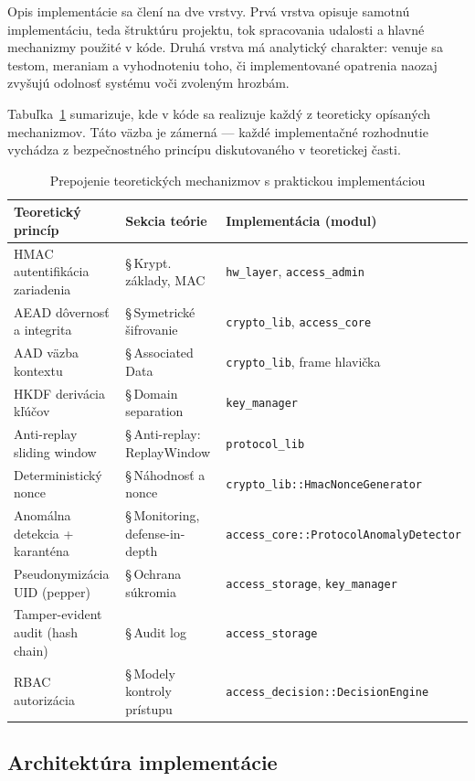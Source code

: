 \documentclass[journal,a4paper,onecolumn]{IEEEtran}
\begin{document}
Opis implementácie sa člení na dve vrstvy. Prvá vrstva opisuje samotnú implementáciu, teda štruktúru projektu, tok spracovania udalosti a hlavné mechanizmy použité v kóde. Druhá vrstva má analytický charakter: venuje sa testom, meraniam a vyhodnoteniu toho, či implementované opatrenia naozaj zvyšujú odolnosť systému voči zvoleným hrozbám.

Tabuľka~\ref{tab:theory-practice} sumarizuje, kde v kóde sa realizuje každý z teoreticky opísaných mechanizmov. Táto väzba je zámerná --- každé implementačné rozhodnutie vychádza z bezpečnostného princípu diskutovaného v teoretickej časti.

\begin{table}[htbp]
\renewcommand{\arraystretch}{1.3}
\centering
\caption{Prepojenie teoretických mechanizmov s praktickou implementáciou}
\label{tab:theory-practice}
\small
\begin{tabular}{p{4.0cm} p{3.2cm} p{4.0cm}}
\toprule
\textbf{Teoretický princíp} & \textbf{Sekcia teórie} & \textbf{Implementácia (modul)} \\
\midrule
HMAC autentifikácia zariadenia & §\,Krypt. základy, MAC & \texttt{hw\_layer}, \texttt{access\_admin} \\
AEAD dôvernosť a integrita & §\,Symetrické šifrovanie & \texttt{crypto\_lib}, \texttt{access\_core} \\
AAD väzba kontextu & §\,Associated Data & \texttt{crypto\_lib}, frame hlavička \\
HKDF derivácia kľúčov & §\,Domain separation & \texttt{key\_manager} \\
Anti-replay sliding window & §\,Anti-replay: ReplayWindow & \texttt{protocol\_lib} \\
Deterministický nonce & §\,Náhodnosť a nonce & \texttt{crypto\_lib::HmacNonceGenerator} \\
Anomálna detekcia + karanténa & §\,Monitoring, defense-in-depth & \texttt{access\_core::ProtocolAnomalyDetector} \\
Pseudonymizácia UID (pepper) & §\,Ochrana súkromia & \texttt{access\_storage}, \texttt{key\_manager} \\
Tamper-evident audit (hash chain) & §\,Audit log & \texttt{access\_storage} \\
RBAC autorizácia & §\,Modely kontroly prístupu & \texttt{access\_decision::DecisionEngine} \\
\bottomrule
\end{tabular}
\end{table}

\subsection{Architektúra implementácie}
\end{document}
